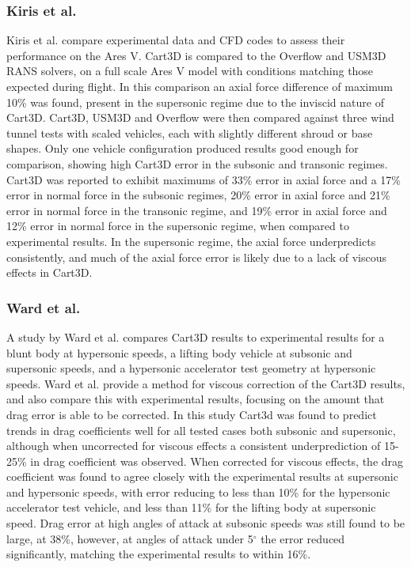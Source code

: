 \subsubsection{Kiris et al.}
Kiris et al. compare experimental data and CFD codes to assess their performance on the Ares V\cite{Kiris2011}. Cart3D is compared to the Overflow and USM3D RANS solvers, on a full scale Ares V model with conditions matching those expected during flight. In this comparison an axial force difference of maximum 10\% was found, present in the supersonic regime due to the inviscid nature of Cart3D\cite{Kiris2011}. Cart3D, USM3D and Overflow were then compared against three wind tunnel tests with scaled vehicles, each with slightly different shroud or base shapes. Only one vehicle configuration produced results good enough for comparison\cite{Kiris2011}, showing high Cart3D error in the subsonic and transonic regimes. Cart3D was reported to exhibit maximums of 33\% error in axial force and a 17\% error in normal force in the subsonic regimes, 20\% error in axial force and 21\% error in normal force in the transonic regime, and 19\% error in axial force and 12\% error in normal force in the supersonic regime, when compared to experimental results. In the supersonic regime, the axial force underpredicts consistently, and much of the axial force error is likely due to a lack of viscous effects in Cart3D. 

\subsubsection{Ward et al.}
A study by Ward et al.\cite{Ward2018} compares Cart3D results to experimental results for a blunt body at hypersonic speeds, a lifting body vehicle at subsonic and supersonic speeds, and a hypersonic accelerator test geometry at hypersonic speeds. Ward et al. provide a method for viscous correction of the Cart3D results, and also compare this with experimental results, focusing on the amount that drag error is able to be corrected. In this study Cart3d was found to predict trends in drag coefficients well for all tested cases both subsonic and supersonic, although when uncorrected for viscous effects a consistent underprediction of 15-25\% in drag coefficient was observed\cite{Ward2018}. When corrected for viscous effects, the drag coefficient was found to agree closely with the experimental results at supersonic and hypersonic speeds, with error reducing to less than 10\% for the hypersonic accelerator test vehicle, and less than 11\% for the lifting body at supersonic speed\cite{Ward2018}. Drag error at high angles of attack at subsonic speeds was still found to be large, at 38\%, however, at angles of attack under 5$^\circ$ the error reduced significantly, matching the experimental results to within 16\%. 

